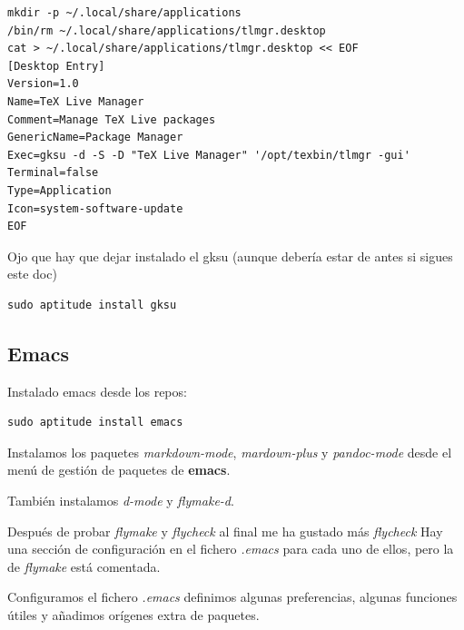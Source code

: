 \documentclass[12pt,spanish,]{scrartcl}
\begin{document}
\begin{verbatim}
mkdir -p ~/.local/share/applications
/bin/rm ~/.local/share/applications/tlmgr.desktop
cat > ~/.local/share/applications/tlmgr.desktop << EOF
[Desktop Entry]
Version=1.0
Name=TeX Live Manager
Comment=Manage TeX Live packages
GenericName=Package Manager
Exec=gksu -d -S -D "TeX Live Manager" '/opt/texbin/tlmgr -gui'
Terminal=false
Type=Application
Icon=system-software-update
EOF
\end{verbatim}

Ojo que hay que dejar instalado el gksu (aunque debería estar de antes
si sigues este doc)

\begin{verbatim}
sudo aptitude install gksu
\end{verbatim}

\subsection{Emacs}\label{emacs}

Instalado emacs desde los repos:

\begin{verbatim}
sudo aptitude install emacs
\end{verbatim}

Instalamos los paquetes \emph{markdown-mode}, \emph{mardown-plus} y
\emph{pandoc-mode} desde el menú de gestión de paquetes de
\textbf{emacs}.

También instalamos \emph{d-mode} y \emph{flymake-d}.

Después de probar \emph{flymake} y \emph{flycheck} al final me ha
gustado más \emph{flycheck} Hay una sección de configuración en el
fichero \emph{.emacs} para cada uno de ellos, pero la de \emph{flymake}
está comentada.

Configuramos el fichero \emph{.emacs} definimos algunas preferencias,
algunas funciones útiles y añadimos orígenes extra de paquetes.
\end{document}
